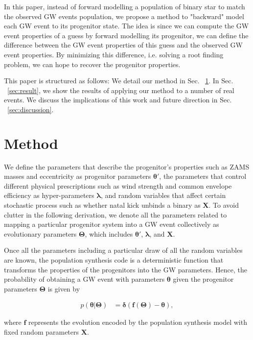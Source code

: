 \documentclass[twocolumn]{aastex631}
\begin{document}
In this paper, instead of forward modelling a population of binary star to match the observed GW events population,
we propose a method to "backward" model each GW event to its progenitor state.
The idea is since we can compute the GW event properties of a guess by forward modelling its progenitor,
we can define the difference between the GW event properties of this guess and the observed GW event properties.
By minimizing this difference, i.e. solving a root finding problem, we can hope to recover the progenitor properties.

This paper is structured as follows: We detail our method in Sec. ~\ref{sec:method}.
In Sec. ~\ref{sec:result}, we show the results of applying our method to a number of real events.
We discuss the implications of this work and future direction in Sec. ~\ref{sec:discussion}.

\section{Method}
\label{sec:method}

We define the parameters that describe the progenitor's properties such as ZAMS masses and eccentricity as progenitor parameters $\bm{\theta'}$,
the parameters that control different physical prescriptions such as wind strength and common envelope efficiency as hyper-parameters $\bm{\lambda}$,
and random variables that affect certain stochastic process such as whether natal kick unbinds a binary as $\bm{X}$.
To avoid clutter in the following derivation,
we denote all the parameters related to mapping a particular progenitor system into a GW event collectively as evolutionary parameters $\bm{\Theta}$,
which includes $\bm{\theta'}$, $\bm{\lambda}$, and $\bm{X}$.

Once all the parameters including a particular draw of all the random variables are known,
the population synthesis code is a deterministic function that transforms the properties of the progenitors into the GW parameters.
Hence, the probability of obtaining a GW event with parameters $\bm{\theta}$ given the progenitor parameters $\bm{\Theta}$ is given by

\begin{align}
    p(\bm{\theta}|\bm{\Theta}) &= \bm{\delta}(\bm{f}(\bm{\Theta})-\bm{\theta}),
\end{align}

where $\bm{f}$ represents the evolution encoded by the population synthesis model with fixed random parameters $\bm{X}$.
\end{document}

